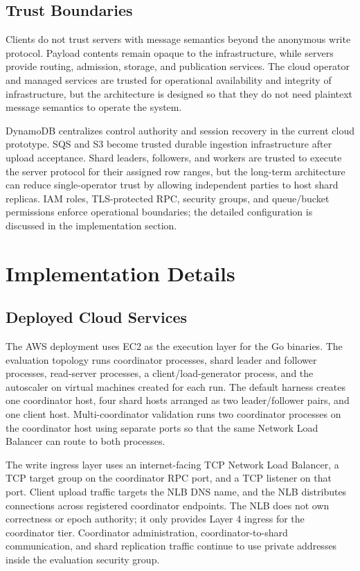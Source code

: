 \documentclass[conference]{IEEEtran}
\begin{document}
\subsection{Trust Boundaries}

Clients do not trust servers with message semantics beyond the anonymous write protocol. Payload contents remain opaque to the infrastructure, while servers provide routing, admission, storage, and publication services. The cloud operator and managed services are trusted for operational availability and integrity of infrastructure, but the architecture is designed so that they do not need plaintext message semantics to operate the system.

DynamoDB centralizes control authority and session recovery in the current cloud prototype. SQS and S3 become trusted durable ingestion infrastructure after upload acceptance. Shard leaders, followers, and workers are trusted to execute the server protocol for their assigned row ranges, but the long-term architecture can reduce single-operator trust by allowing independent parties to host shard replicas. IAM roles, TLS-protected RPC, security groups, and queue/bucket permissions enforce operational boundaries; the detailed configuration is discussed in the implementation section.

\section{Implementation Details}

\subsection{Deployed Cloud Services}

The AWS deployment uses EC2 as the execution layer for the Go binaries. The evaluation topology runs coordinator processes, shard leader and follower processes, read-server processes, a client/load-generator process, and the autoscaler on virtual machines created for each run. The default harness creates one coordinator host, four shard hosts arranged as two leader/follower pairs, and one client host. Multi-coordinator validation runs two coordinator processes on the coordinator host using separate ports so that the same Network Load Balancer can route to both processes.

The write ingress layer uses an internet-facing TCP Network Load Balancer, a TCP target group on the coordinator RPC port, and a TCP listener on that port. Client upload traffic targets the NLB DNS name, and the NLB distributes connections across registered coordinator endpoints. The NLB does not own correctness or epoch authority; it only provides Layer 4 ingress for the coordinator tier. Coordinator administration, coordinator-to-shard communication, and shard replication traffic continue to use private addresses inside the evaluation security group.
\end{document}
